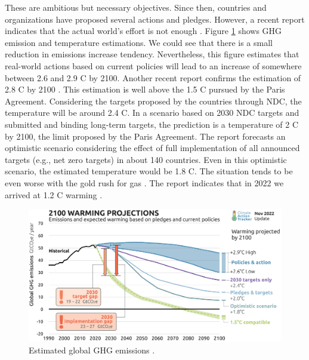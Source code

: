 These are ambitious but necessary objectives. Since then, countries and organizations have proposed several actions and pledges. However, a recent report indicates that the actual world's effort is not enough \cite{tracker2022projections}. Figure \ref{fig:ghg_cat} shows GHG emission and temperature estimations. We could see that there is a small reduction in emissions increase tendency. Nevertheless, this figure estimates that real-world actions based on current policies will lead to an increase of somewhere between 2.6 and 2.9 \degree C by 2100. Another recent report confirms the estimation of 2.8 \degree C by 2100 \cite{lee2023ar6}. This estimation is well above the 1.5 \degree C pursued by the Paris Agreement. Considering the targets proposed by the countries through NDC, the temperature will be around 2.4 \degree C. In a scenario based on 2030 NDC targets and submitted and binding long-term targets, the prediction is a temperature of 2 \degree C by 2100, the limit proposed by the Paris Agreement. The report forecasts an optimistic scenario considering the effect of full implementation of all announced targets (e.g., net zero targets) in about 140 countries. Even in this optimistic scenario, the estimated temperature would be 1.8 \degree C. The situation tends to be even worse with the gold rush for gas \cite{tracker2022massive}. The report indicates that in 2022 we arrived at 1.2 \degree C warming \cite{tracker2022projections}.

\begin{figure}[!htb]
    \centering
    \includegraphics[scale=0.09]{Images/Related_works/Emissions_2022-11.png}
    \caption[Estimated global GHG emissions.]{Estimated global GHG emissions \cite{tracker2022projections}.}
    \label{fig:ghg_cat}
\end{figure}

